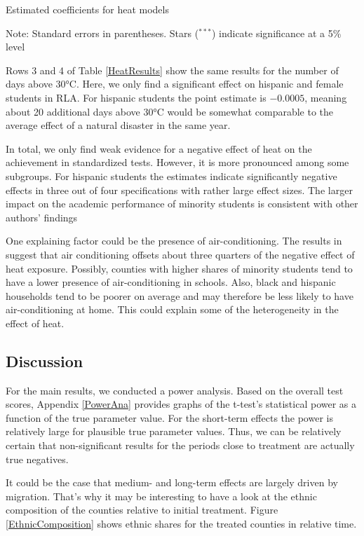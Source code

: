 \begin{table}
	\caption{Estimated coefficients for heat models}
	\label{HeatResults}
	
	{\raggedright Note: Standard errors in parentheses. Stars ($^{***}$) indicate significance at a 5\% level \par}
\end{table}

Rows 3 and 4 of Table \ref{HeatResults} show the same results for the number of days above 30°C. Here, we only find a significant effect on hispanic and female students in RLA. For hispanic students the point estimate is $-0.0005$, meaning about 20 additional days above 30°C would be somewhat comparable to the average effect of a natural disaster in the same year.

In total, we only find weak evidence for a negative effect of heat on the achievement in standardized tests. However, it is more pronounced among some subgroups. For hispanic students the estimates indicate significantly negative effects in three out of four specifications with rather large effect sizes. The larger impact on the academic performance of minority students is consistent with other authors' findings \citep[for example][]{Goodman_2020}

One explaining factor could be the presence of air-conditioning. The results in \cite{Goodman_2020} suggest that air conditioning offsets about three quarters of the negative effect of heat exposure. Possibly, counties with higher shares of minority students tend to have a lower presence of air-conditioning in schools. Also, black and hispanic households tend to be poorer on average and may therefore be less likely to have air-conditioning at home. This could explain some of the heterogeneity in the effect of heat.


\subsection{Discussion}

For the main results, we conducted a power analysis. Based on the overall test scores, Appendix \ref{PowerAna} provides graphs of the t-test's statistical power as a function of the true parameter value. For the short-term effects the power is relatively large for plausible true parameter values. Thus, we can be relatively certain that non-significant results for the periods close to treatment are actually true negatives.

It could be the case that medium- and long-term effects are largely driven by migration. That's why it may be interesting to have a look at the ethnic composition of the counties relative to initial treatment. Figure \ref{EthnicComposition} shows ethnic shares for the treated counties in relative time.

